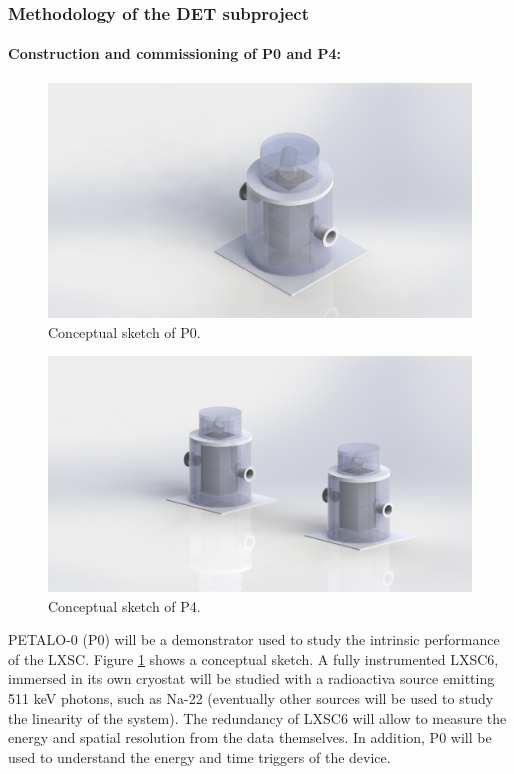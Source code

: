 \subsubsection*{Methodology of the DET subproject}

\paragraph{Construction and commissioning of P0 and P4:}

\begin{figure}[!htb]
	\centering
	\includegraphics[scale=0.4]{img/PETALO-0.jpg}
	\caption{\label{fig.P0} Conceptual sketch of P0.  }
\end{figure}

\begin{figure}[!htb]
	\centering
	\includegraphics[scale=0.4]{img/PETALO-4.JPG}
	\caption{\label{fig.P2} Conceptual sketch of P4. }
\end{figure}

PETALO-0 (P0) will be a demonstrator used to study the intrinsic performance of the LXSC. Figure \ref{fig.P0} shows a conceptual sketch. A fully instrumented LXSC6, immersed in its own cryostat will be studied with a radioactiva source emitting 511 keV photons, such as Na-22 (eventually other sources will be used to study the linearity of the system). The redundancy of LXSC6 will allow to measure the energy and spatial resolution from the data themselves. In addition, P0 will be used to understand the energy and time triggers of the device. 


